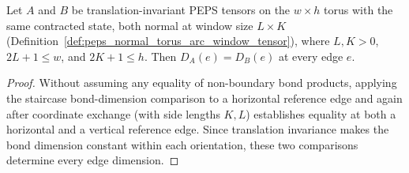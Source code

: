 \begin{lemma}%
    \label{thm:peps_arc_window_all_bond_dimensions}
    \leanok
    Let $A$ and $B$ be translation-invariant PEPS tensors on the
    $w\times h$ torus with the same contracted state, both normal at
    window size $L\times K$
    (Definition~\ref{def:peps_normal_torus_arc_window_tensor}), where
    $L,K>0$, $2L+1\leq w$, and $2K+1\leq h$. Then $D_A(e)=D_B(e)$ at
    every edge $e$.
\end{lemma}
\begin{proof}
    \leanok
    Without assuming any equality of non-boundary bond products,
    applying the staircase bond-dimension comparison to a horizontal
    reference edge and again after coordinate exchange (with side lengths
    $K,L$) establishes equality at both a horizontal and a vertical reference
    edge. Since translation invariance makes the bond dimension constant
    within each orientation, these two comparisons determine every
    edge dimension.
\end{proof}


